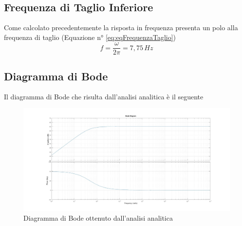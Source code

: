 \subsection{Frequenza di Taglio Inferiore}\label{subsec:frequenza_taglio_inferiore}
Come calcolato precedentemente la risposta in frequenza presenta un polo alla frequenza di taglio  (Equazione n° \ref{eq:eqFrequenzaTaglio})
$$f = \dfrac{\omega}{2\pi} = 7,75\hspace{2pt}Hz$$

\subsection{Diagramma di Bode}\label{subsec:diagramma_bode}
Il diagramma di Bode che risulta dall'analisi analitica è il seguente\\
\begin{figure}[h]
    \centering
    \includegraphics[width=1\textwidth]{Figure/BodeAnalitico.jpg}
    \caption{Diagramma di Bode ottenuto dall'analisi analitica}
    \label{fig:bodeAnalitico}
\end{figure}
\newpage
